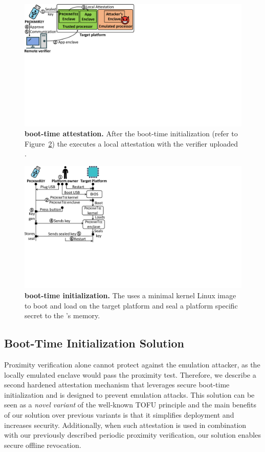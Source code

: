 \begin{figure}[t]
 \centering
\includegraphics[trim={0 11.6cm 16.5cm 0},clip,width=0.72\linewidth]{chapters/ProximiTEE/figures/boot-attest.pdf}
 \caption[\name boot-time attestation]{\textbf{\name boot-time attestation.} After the boot-time initialization (refer to Figure~\ref{fig:boot-init}) the \nameclave executes a local attestation with the verifier uploaded \app. 
 }
 \label{fig:boot-attest}
\end{figure}


\begin{figure}[t]
 \centering
    \includegraphics[trim={0 7cm 19cm 0},clip,width=0.7\linewidth]{chapters/ProximiTEE/figures/boot_init.pdf}
 \caption[\name noot-time initialization]{\textbf{\name boot-time initialization.} The \device uses a minimal kernel Linux image to boot and load \nameclave on the target platform and seal a platform specific secret to the \device{}'s memory.}
 \label{fig:boot-init}
\end{figure}



\subsection{Boot-Time Initialization Solution}

Proximity verification alone cannot protect against the emulation attacker, as the locally emulated enclave would pass the proximity test. 
%
Therefore, we describe a second hardened attestation mechanism that leverages secure boot-time initialization and is designed to prevent emulation attacks. This solution can be seen as a \emph{novel variant} of the well-known TOFU principle and the main benefits of our solution over previous variants is that it simplifies deployment and increases security. Additionally, when such attestation is used in combination with our previously described periodic proximity verification, our solution enables secure offline revocation.


